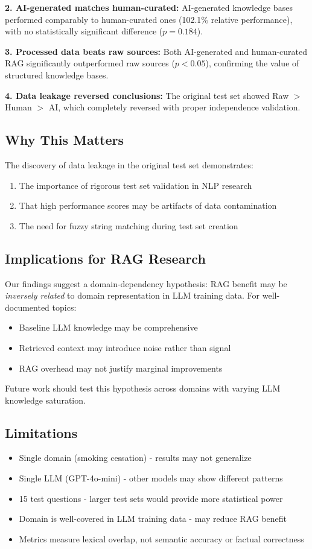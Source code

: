 \documentclass{article}
\begin{document}
\textbf{2. AI-generated matches human-curated:} AI-generated knowledge bases performed comparably to human-curated ones (102.1\% relative performance), with no statistically significant difference ($p = 0.184$).

\textbf{3. Processed data beats raw sources:} Both AI-generated and human-curated RAG significantly outperformed raw sources ($p < 0.05$), confirming the value of structured knowledge bases.

\textbf{4. Data leakage reversed conclusions:} The original test set showed Raw $>$ Human $>$ AI, which completely reversed with proper independence validation.

\subsection{Why This Matters}
The discovery of data leakage in the original test set demonstrates:
\begin{enumerate}
    \item The importance of rigorous test set validation in NLP research
    \item That high performance scores may be artifacts of data contamination
    \item The need for fuzzy string matching during test set creation
\end{enumerate}

\subsection{Implications for RAG Research}

Our findings suggest a domain-dependency hypothesis: RAG benefit may be \textit{inversely related} to domain representation in LLM training data. For well-documented topics:
\begin{itemize}
    \item Baseline LLM knowledge may be comprehensive
    \item Retrieved context may introduce noise rather than signal
    \item RAG overhead may not justify marginal improvements
\end{itemize}

Future work should test this hypothesis across domains with varying LLM knowledge saturation.

\subsection{Limitations}
\begin{itemize}
    \item Single domain (smoking cessation) - results may not generalize
    \item Single LLM (GPT-4o-mini) - other models may show different patterns
    \item 15 test questions - larger test sets would provide more statistical power
    \item Domain is well-covered in LLM training data - may reduce RAG benefit
    \item Metrics measure lexical overlap, not semantic accuracy or factual correctness
\end{itemize}
\end{document}
